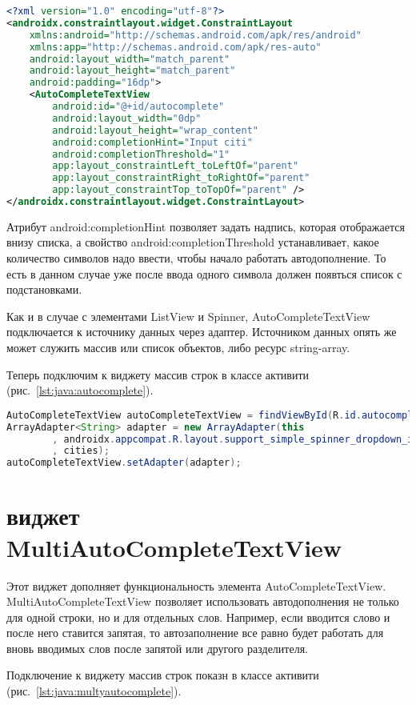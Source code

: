 \begin{lstlisting}[language=XML
	, label=lst:xml:autocomplete
	]
<?xml version="1.0" encoding="utf-8"?>
<androidx.constraintlayout.widget.ConstraintLayout
	xmlns:android="http://schemas.android.com/apk/res/android"
	xmlns:app="http://schemas.android.com/apk/res-auto"
	android:layout_width="match_parent"
	android:layout_height="match_parent"
	android:padding="16dp">
	<AutoCompleteTextView
		android:id="@+id/autocomplete"
		android:layout_width="0dp"
		android:layout_height="wrap_content"
		android:completionHint="Input citi"
		android:completionThreshold="1"
		app:layout_constraintLeft_toLeftOf="parent"
		app:layout_constraintRight_toRightOf="parent"
		app:layout_constraintTop_toTopOf="parent" />
</androidx.constraintlayout.widget.ConstraintLayout>
\end{lstlisting}

Атрибут android:completionHint позволяет задать надпись, которая
отображается внизу списка, а свойство android:completionThreshold
устанавливает, какое количество символов надо ввести, чтобы начало
работать автодополнение. То есть в данном случае уже после ввода одного
символа должен появться список с подстановками.\par
Как и в случае с элементами ListView и Spinner, AutoCompleteTextView
подключается к источнику данных через адаптер. Источником данных опять
же может служить массив или список объектов, либо ресурс string-array.\par
Теперь подключим к виджету массив строк в классе активити
(рис.~\ref{lst:java:autocomplete}).

\begin{lstlisting}[language=Java
	, label=lst:java:autocomplete
	]
AutoCompleteTextView autoCompleteTextView = findViewById(R.id.autocomplete);
ArrayAdapter<String> adapter = new ArrayAdapter(this
		, androidx.appcompat.R.layout.support_simple_spinner_dropdown_item
		, cities);
autoCompleteTextView.setAdapter(adapter);
\end{lstlisting}

\section{виджет MultiAutoCompleteTextView}
Этот виджет дополняет функциональность элемента AutoCompleteTextView.
MultiAutoCompleteTextView позволяет использовать автодополнения не
только для одной строки, но и для отдельных слов. Например, если вводится
слово и после него ставится запятая, то автозаполнение все равно будет
работать для вновь вводимых слов после запятой или другого разделителя.\par
Подключение к виджету массив строк показн в классе активити
(рис.~\ref{lst:java:multyautocomplete}).

